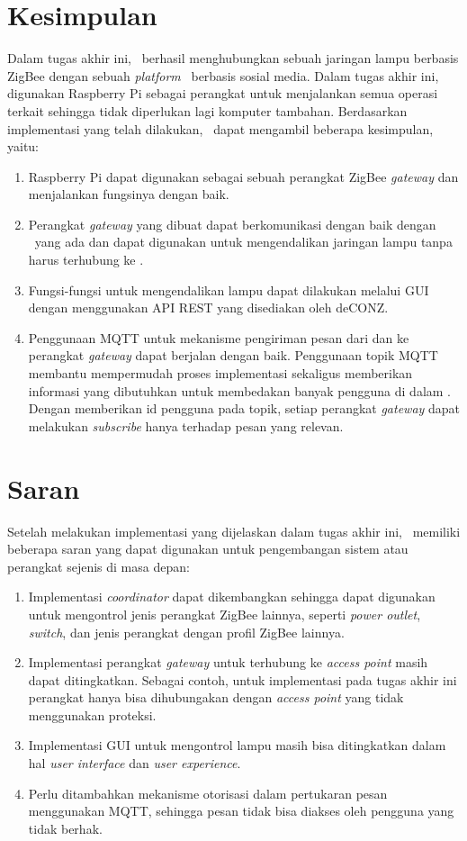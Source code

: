 \section{Kesimpulan}
Dalam tugas akhir ini, \saya~berhasil menghubungkan sebuah jaringan lampu berbasis ZigBee dengan sebuah \textit{platform} \iot~berbasis sosial media. Dalam tugas akhir ini, digunakan Raspberry Pi sebagai perangkat untuk menjalankan semua operasi terkait sehingga tidak diperlukan lagi komputer tambahan. Berdasarkan implementasi yang telah dilakukan, \saya~dapat mengambil beberapa kesimpulan, yaitu:
\begin{enumerate}
	\item Raspberry Pi dapat digunakan sebagai sebuah perangkat ZigBee \textit{gateway} dan menjalankan fungsinya dengan baik.
	\item Perangkat \textit{gateway} yang dibuat dapat berkomunikasi dengan baik dengan \plat~yang ada dan dapat digunakan untuk mengendalikan jaringan lampu tanpa harus terhubung ke \plat.
	\item Fungsi-fungsi untuk mengendalikan lampu dapat dilakukan melalui GUI dengan menggunakan API REST yang disediakan oleh deCONZ.
	\item Penggunaan MQTT untuk mekanisme pengiriman pesan dari dan ke perangkat \textit{gateway} dapat berjalan dengan baik. Penggunaan topik MQTT membantu mempermudah proses implementasi sekaligus memberikan informasi yang dibutuhkan untuk membedakan banyak pengguna di dalam \plat. Dengan memberikan id pengguna pada topik, setiap perangkat \textit{gateway} dapat melakukan \textit{subscribe} hanya terhadap pesan yang relevan.
\end{enumerate}

\section{Saran}
Setelah melakukan implementasi yang dijelaskan dalam tugas akhir ini, \saya~memiliki beberapa saran yang dapat digunakan untuk pengembangan sistem atau perangkat sejenis di masa depan:
\begin{enumerate}
	\item Implementasi \textit{coordinator} dapat dikembangkan sehingga dapat digunakan untuk mengontrol jenis perangkat ZigBee lainnya, seperti \textit{power outlet}, \textit{switch}, dan jenis perangkat dengan profil ZigBee lainnya.
	\item Implementasi perangkat \textit{gateway} untuk terhubung ke \textit{access point} masih dapat ditingkatkan. Sebagai contoh, untuk implementasi pada tugas akhir ini perangkat hanya bisa dihubungakan dengan \textit{access point} yang tidak menggunakan proteksi.
	\item Implementasi GUI untuk mengontrol lampu masih bisa ditingkatkan dalam hal \textit{user interface} dan \textit{user experience}.
	\item Perlu ditambahkan mekanisme otorisasi dalam pertukaran pesan menggunakan MQTT, sehingga pesan tidak bisa diakses oleh pengguna yang tidak berhak.
\end{enumerate}
